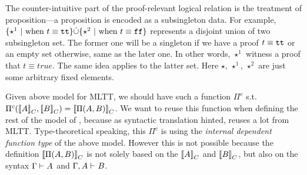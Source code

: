 \newcommand{\Glued}[1]{\ensuremath{{#1}^\bullet}}
\newcommand{\GluedPi}[2]{\ensuremath{\Pi^\bullet({#1},{#2})}}
\newcommand{\GSubstExt}[2]{\ensuremath{{#1},^\bullet{#2}}}
\newcommand{\Gpair}[2]{\ensuremath{({#1},^\bullet{#2})}}
\newcommand{\Gfst}[1]{\ensuremath{\texttt{fst}^\bullet~{#1}}}
\newcommand{\Gsnd}[1]{\ensuremath{\texttt{snd}^\bullet~{#1}}}
\newcommand{\Gsub}[2]{\ensuremath{{#1}\!\left[{#2}\right]^\bullet}}
\newcommand{\Glam}[1]{\ensuremath{\lambda^\bullet({#1})}}
\newcommand{\Gapp}[1]{\ensuremath{\texttt{app}^\bullet({#1})}}
\newcommand{\GSubstWeak}[1]{\ensuremath{(\texttt{p}^\bullet)^{#1}}}
\newcommand{\GLSigAdd}[3]{\ensuremath{\nu^{+\bullet}({#1},{#2},{#3})}}
\newcommand{\GCaseSig}[3]{\ensuremath{\texttt{CaseTy}^\bullet({#1},{#2},{#3})}}
\newcommand{\Gmodel}[1]{\ensuremath{{({#1})}^c}}
\newcommand{\GEl}[1]{\ensuremath{\Glued{\texttt{El}}({#1})}}
\newcommand{\Gwcode}[1]{\ensuremath{\Glued{\texttt{W}}({#1})}}
\newcommand{\GSubstId}{\ensuremath{\GSubstWeak{0}}}
\newcommand{\Gwsigproj}[3]{\ensuremath{\Glued{{\texttt{w}\pi^{#1}_{\texttt{#2}}}}({#3})}}
\newcommand{\GRecproj}[2]{\ensuremath{\Glued{{\texttt{R}\pi^{#1}}}({#2})}}



The counter-intuitive part of the proof-relevant logical relation is the treatment of proposition---a proposition is encoded as a subsingleton data. For example, $\{\star^1 \ | \text{ when } t \equiv \texttt{tt}  \} \dot{\cup} \{\star^2 \ | \text{ when } t \equiv \texttt{ff}  \}$ represents a disjoint union of two subsingleton set. The former one will be a singleton if we have a proof $t \equiv \texttt{tt}$ or an empty set otherwise, same as the later one.  In other words, $\star^1$ witness a proof that $t \equiv true$. The same idea applies to the latter set. Here $\star$, $\star^1$, $\star^2$ are just some arbitrary fixed elements.  


Given above model for MLTT, we should have such a function ${\Pi}^c$ s.t. ${\Pi}^c({{\llbracket {A} \rrbracket}_C},{{\llbracket {B} \rrbracket}_C}) = {\llbracket {\ensuremath{\Pi({A},{B})}} \rrbracket}_C$. We want to reuse this function when defining the rest of the model of \TT, because as syntactic translation hinted, \TT reuses a lot from MLTT. Type-theoretical speaking, this ${\Pi}^c$ is using the \emph{internal dependent function type} of the above model. However this is not possible because the definition ${\llbracket {\ensuremath{\Pi({A},{B})}} \rrbracket}_C$ is not solely based on the ${\llbracket {A} \rrbracket}_C$ and ${\llbracket {B} \rrbracket}_C$, but also on the syntax $ {\Gamma} \vdash_{} {A} $ and $ {\Gamma, A} \vdash_{} {B} $. 

